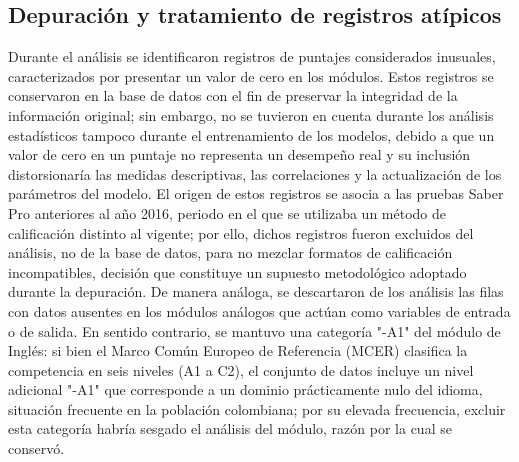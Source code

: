 \subsection{Depuración y tratamiento de registros atípicos}
Durante el análisis se identificaron registros de puntajes considerados inusuales, caracterizados por presentar un valor de cero en los módulos. Estos registros se conservaron en la base de datos con el fin de preservar la integridad de la información original; sin embargo, no se tuvieron en cuenta durante los análisis estadísticos tampoco durante el entrenamiento de los modelos, debido a que un valor de cero en un puntaje no representa un desempeño real y su inclusión distorsionaría las medidas descriptivas, las correlaciones y la actualización de los parámetros del modelo. El origen de estos registros se asocia a las pruebas Saber Pro anteriores al año 2016, periodo en el que se utilizaba un método de calificación distinto al vigente; por ello, dichos registros fueron excluidos del análisis, no de la base de datos, para no mezclar formatos de calificación incompatibles, decisión que constituye un supuesto metodológico adoptado durante la depuración. De manera análoga, se descartaron de los análisis las filas con datos ausentes en los módulos análogos que actúan como variables de entrada o de salida. En sentido contrario, se mantuvo una categoría "-A1" del módulo de Inglés: si bien el Marco Común Europeo de Referencia (MCER) clasifica la competencia en seis niveles (A1 a C2), el conjunto de datos incluye un nivel adicional "-A1" que corresponde a un dominio prácticamente nulo del idioma, situación frecuente en la población colombiana; por su elevada frecuencia, excluir esta categoría habría sesgado el análisis del módulo, razón por la cual se conservó.

